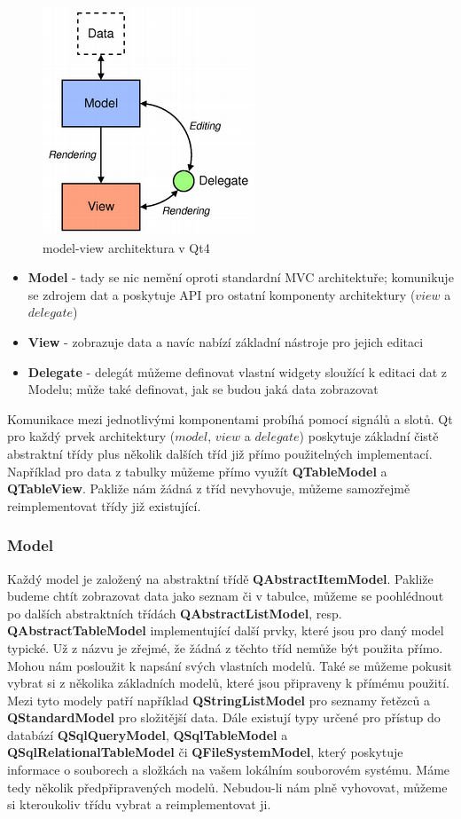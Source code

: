 \begin{figure}[h]
	\centering
	\includegraphics[scale=0.7]{pictures/qt/mv}
	\caption{model-view architektura v Qt4}
	\label{mvc}
\end{figure}

\begin{itemize}
	\item{\textbf{Model}} - tady se nic nemění oproti standardní MVC architektuře; komunikuje se zdrojem dat a poskytuje API pro ostatní komponenty architektury ($view$ a $delegate$)
	\item{\textbf{View}} - zobrazuje data a navíc nabízí základní nástroje pro jejich editaci
	\item{\textbf{Delegate}} - delegát můžeme definovat vlastní widgety sloužící k editaci dat z Modelu; může také definovat, jak se budou jaká data zobrazovat
\end{itemize}

Komunikace mezi jednotlivými komponentami probíhá pomocí signálů a slotů. Qt pro každý prvek architektury ($model$, $view$ a $delegate$) poskytuje základní čistě abstraktní třídy plus několik dalších tříd již přímo použitelných implementací. Například pro data z tabulky můžeme přímo využít \textbf{QTableModel} a \textbf{QTableView}. Pakliže nám žádná z tříd nevyhovuje, můžeme samozřejmě reimplementovat třídy již existující.

\subsubsection*{Model}
Každý model je založený na abstraktní třídě \textbf{QAbstractItemModel}. Pakliže budeme chtít zobrazovat data jako seznam či v tabulce, můžeme se poohlédnout po dalších abstraktních třídách \textbf{QAbstractListModel}, resp. \textbf{QAbstractTableModel} implementující další prvky, které jsou pro daný model typické. Už z názvu je zřejmé, že žádná z těchto tříd nemůže být použita přímo. Mohou nám posloužit k napsání svých vlastních modelů. Také se můžeme pokusit vybrat si z několika základních modelů, které jsou připraveny k přímému použití. Mezi tyto modely patří například \textbf{QStringListModel} pro seznamy řetězců a \textbf{QStandardModel} pro složitější data. Dále existují typy určené pro přístup do databází \textbf{QSqlQueryModel}, \textbf{QSqlTableModel} a \textbf{QSqlRelationalTableModel} či \textbf{QFileSystemModel}, který poskytuje informace o souborech a složkách na vašem lokálním souborovém systému. Máme tedy několik předpřipravených modelů. Nebudou-li nám plně vyhovovat, můžeme si kteroukoliv třídu vybrat a reimplementovat ji.

